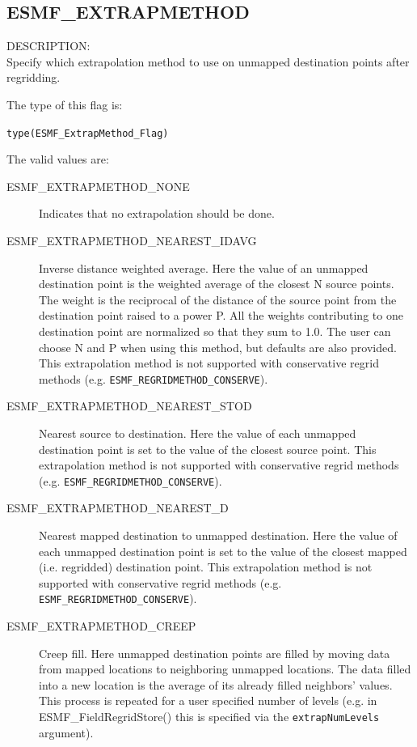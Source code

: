 \subsection{ESMF\_EXTRAPMETHOD}
\label{opt:extrapmethod}

{\sf DESCRIPTION:\\}  
Specify which extrapolation method to use on unmapped destination points after regridding. 

The type of this flag is:

{\tt type(ESMF\_ExtrapMethod\_Flag)}

The valid values are:
\begin{description}
\item [ESMF\_EXTRAPMETHOD\_NONE]
     Indicates that no extrapolation should be done. 
\item [ESMF\_EXTRAPMETHOD\_NEAREST\_IDAVG]
      Inverse distance weighted average. 
      Here the value of an unmapped destination point is the weighted average
      of the closest N source points. The weight is 
      the reciprocal of the distance of the source point from the destination point raised to a power P.
      All the weights contributing to one destination point are normalized so that they sum to 1.0. 
      The user can choose N and P when using this method, but defaults are also provided.  
      This extrapolation method is not supported with conservative regrid methods 
      (e.g. {\tt ESMF\_REGRIDMETHOD\_CONSERVE}).
\item [ESMF\_EXTRAPMETHOD\_NEAREST\_STOD]
      Nearest source to destination. 
      Here the value of each unmapped destination point is set to the value of the closest source point. 
       This extrapolation method is not supported with conservative regrid methods
      (e.g. {\tt ESMF\_REGRIDMETHOD\_CONSERVE}).
\item [ESMF\_EXTRAPMETHOD\_NEAREST\_D]
      Nearest mapped destination to unmapped destination. 
      Here the value of each unmapped destination point is set to the value of the closest mapped (i.e. regridded) destination point. 
      This extrapolation method is not supported with conservative regrid methods
      (e.g. {\tt ESMF\_REGRIDMETHOD\_CONSERVE}).
\item [ESMF\_EXTRAPMETHOD\_CREEP]
      Creep fill.
      Here unmapped destination points are filled by moving data from mapped locations to neighboring unmapped locations. 
      The data filled into a new location is the average of its already filled neighbors' values. 
      This process is repeated for a user specified number of levels (e.g. in ESMF\_FieldRegridStore() this is specified via the {\tt extrapNumLevels} argument).

\end{description}
